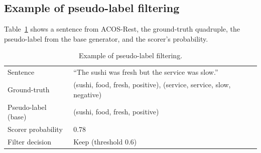 \documentclass{article}
\begin{document}
\subsection{Example of pseudo-label filtering}
Table~\ref{tab:example} shows a sentence from ACOS-Rest, the ground-truth quadruple, the pseudo-label from the base generator, and the scorer's probability.

\begin{table}[h]
\centering
\begin{tabular}{ll}
\toprule
Sentence & ``The sushi was fresh but the service was slow.'' \\
Ground-truth & (sushi, food, fresh, positive), (service, service, slow, negative) \\
Pseudo-label (base) & (sushi, food, fresh, positive) \\
Scorer probability & 0.78 \\
Filter decision & Keep (threshold 0.6) \\
\bottomrule
\end{tabular}
\caption{Example of pseudo-label filtering.}
\label{tab:example}
\end{table}
\end{document}
